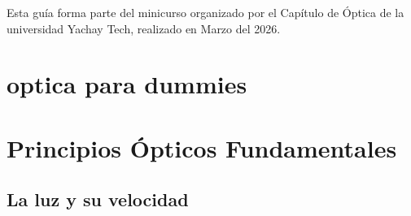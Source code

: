 %
Esta guía forma parte del minicurso organizado por el Capítulo de Óptica de la universidad Yachay Tech, realizado en Marzo del 2026. 


\section{optica para dummies}


\section{Principios Ópticos Fundamentales}
\label{section00_principios_opticos_fundamentales}

\subsection*{La luz y su velocidad}

